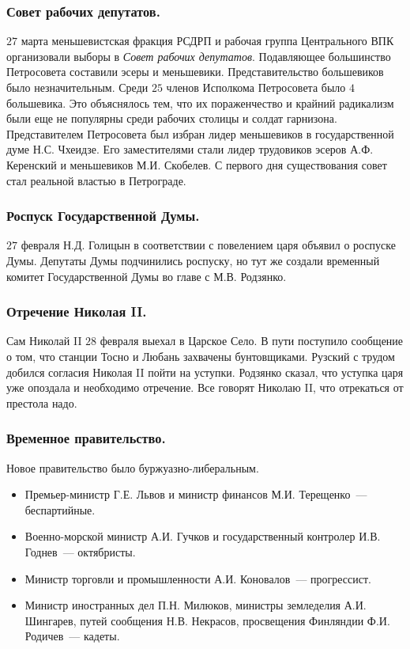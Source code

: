 \documentclass[12pt]{article}
\begin{document}
	\subsubsection{Совет рабочих депутатов.}
	$27$ марта меньшевистская фракция РСДРП и рабочая группа Центрального ВПК организовали выборы в \textit{Совет рабочих депутатов}. Подавляющее большинство Петросовета составили эсеры и меньшевики. Представительство большевиков было незначительным. Среди $25$ членов Исполкома Петросовета было $4$ большевика. Это объяснялось тем, что их пораженчество и крайний радикализм были еще не популярны среди рабочих столицы и солдат гарнизона. Представителем Петросовета был избран лидер меньшевиков в государственной думе Н.С. Чхеидзе. Его заместителями стали лидер трудовиков эсеров А.Ф. Керенский и меньшевиков М.И. Скобелев. С первого дня существования совет стал реальной властью в Петрограде.
	\subsubsection{Роспуск Государственной Думы.}
	$27$ февраля Н.Д. Голицын в соответствии с повелением царя объявил о роспуске Думы. Депутаты Думы подчинились роспуску, но тут же создали временный комитет Государственной Думы во главе с М.В. Родзянко.
	\subsubsection{Отречение Николая II.}
	Сам Николай II $28$ февраля выехал в Царское Село. В пути поступило сообщение о том, что станции Тосно и Любань захвачены бунтовщиками. Рузский с трудом добился согласия Николая II пойти на уступки. Родзянко сказал, что уступка царя уже опоздала и необходимо отречение. Все говорят Николаю II, что отрекаться от престола надо.
	\subsubsection{Временное правительство.}
	Новое правительство было буржуазно-либеральным.
	\begin{itemize}
		\item Премьер-министр Г.Е. Львов и министр финансов М.И. Терещенко~--- беспартийные.
		\item Военно-морской министр А.И. Гучков и государственный контролер И.В. Годнев~--- октябристы.
		\item Министр торговли и промышленности А.И. Коновалов~--- прогрессист.
		\item Министр иностранных дел П.Н. Милюков, министры земледелия А.И. Шингарев, путей сообщения Н.В. Некрасов, просвещения Финляндии Ф.И. Родичев~--- кадеты.
	\end{itemize}
\end{document}
